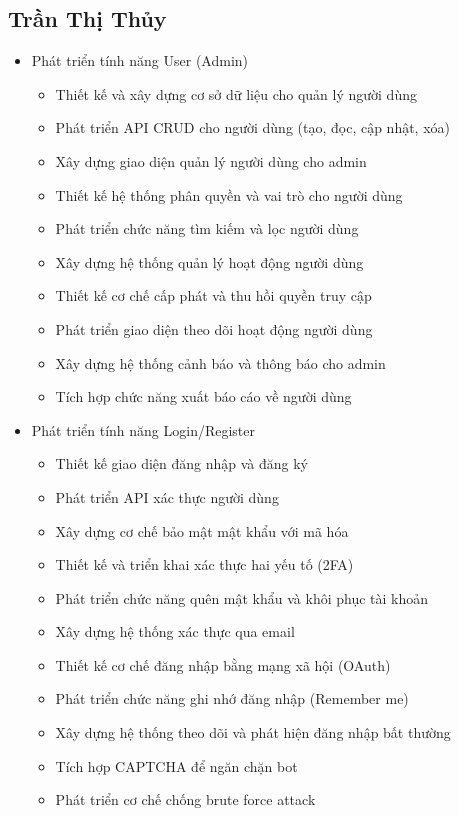 \subsection{Trần Thị Thủy}
\begin{itemize}
    \item Phát triển tính năng User (Admin)
    \begin{itemize}
        \item Thiết kế và xây dựng cơ sở dữ liệu cho quản lý người dùng
        \item Phát triển API CRUD cho người dùng (tạo, đọc, cập nhật, xóa)
        \item Xây dựng giao diện quản lý người dùng cho admin
        \item Thiết kế hệ thống phân quyền và vai trò cho người dùng
        \item Phát triển chức năng tìm kiếm và lọc người dùng
        \item Xây dựng hệ thống quản lý hoạt động người dùng
        \item Thiết kế cơ chế cấp phát và thu hồi quyền truy cập
        \item Phát triển giao diện theo dõi hoạt động người dùng
        \item Xây dựng hệ thống cảnh báo và thông báo cho admin
        \item Tích hợp chức năng xuất báo cáo về người dùng
    \end{itemize}
    
    \item Phát triển tính năng Login/Register
    \begin{itemize}
        \item Thiết kế giao diện đăng nhập và đăng ký
        \item Phát triển API xác thực người dùng
        \item Xây dựng cơ chế bảo mật mật khẩu với mã hóa
        \item Thiết kế và triển khai xác thực hai yếu tố (2FA)
        \item Phát triển chức năng quên mật khẩu và khôi phục tài khoản
        \item Xây dựng hệ thống xác thực qua email
        \item Thiết kế cơ chế đăng nhập bằng mạng xã hội (OAuth)
        \item Phát triển chức năng ghi nhớ đăng nhập (Remember me)
        \item Xây dựng hệ thống theo dõi và phát hiện đăng nhập bất thường
        \item Tích hợp CAPTCHA để ngăn chặn bot
        \item Phát triển cơ chế chống brute force attack
    \end{itemize}
    

\end{itemize}
